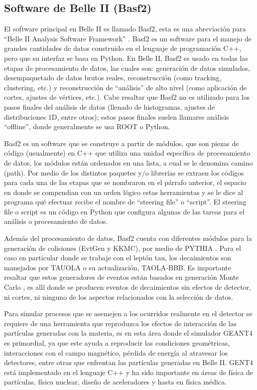 \subsection{Software de Belle II (Basf2)}

El software principal en Belle II es llamado Basf2, esta es una abreviación para ``Belle II Analysis Software Framework'' \cite{Kuhr2018}. Basf2 es un software para el manejo de grandes cantidades de datos construido en el lenguaje de programación C++, pero que su interfaz se basa en Python. En Belle II, Basf2 es usado en todas las etapas de procesamiento de datos, las cuales son: generación de datos simulados, desempaquetado de datos brutos reales, reconstrucción (como tracking, clustering, etc.) y reconstrucción de ``análisis'' de alto nivel (como aplicación de cortes, ajustes de vértices, etc.). Cabe resaltar que Basf2 no es utilizado para los pasos finales del análisis de datos (llenado de histogramas, ajustes de distribuciones 1D, entre otros); estos pasos finales suelen llamarse análisis ``offline'', donde generalmente se usa ROOT o Python.

Basf2 es un software que se construye a partir de módulos, que son piezas de código (usualmente) en C++ que utiliza una unidad específica de procesamiento de datos, los módulos están ordenados en una lista, a cual se le denomina camino (path). Por medio de los distintos paquetes y/o librerías se extraen los códigos para cada una de las etapas que se nombraron en el párrafo anterior, el espacio en donde se compendian con un orden lógico estas herramientas y se le dice al programa qué efectuar recibe el nombre de ``steering file'' o ``script''. El steering file o script es un código en Python que configura algunas de las tareas para el análisis o procesamiento de datos.

Además del procesamiento de datos, Basf2 cuenta con diferentes módulos para la generación de colisiones (EvtGen y KKMC)\cite{Lange:2001uf}\cite{Wa_s_2001}, por medio de PYTHIA \cite{Sj_strand_2015}. Para el caso en particular donde se trabaje con el leptón tau, los decaimientos son manejados por TAUOLA o su actualización, TAOLA-BBB. Es importante resaltar que estos generadores de eventos están basados en generación Monte Carlo \cite{Sjostrand:2006su}, es allí donde se producen eventos de decaimientos sin efectos de detector, ni cortes, ni ninguno de los aspectos relacionados con la selección de datos.

Para simular procesos que se asemejen a los ocurridos realmente en el detector se requiere de una herramienta que reproduzca los efectos de interacción de las partículas generadas con la materia, es en esta área donde el simulador GEANT4 \cite{GEANT4:2002zbu} es primordial, ya que este ayuda a reproducir las condiciones geométricas, interacciones con el campo magnético, pérdida de energía al atravesar los detectores, entre otras que enfrentan las partículas generadas en Belle II. GENT4 está implementado en el lenguaje C++ y ha sido importante en áreas de física de partículas, física nuclear, diseño de aceleradores y hasta en física médica.

